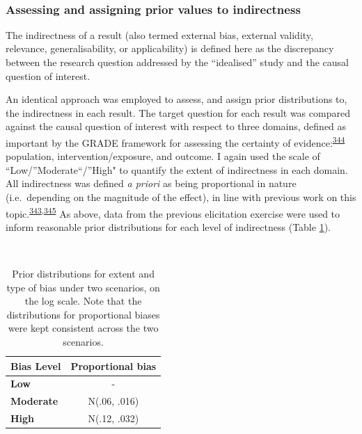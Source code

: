 \documentclass[a4paper, twoside]{templates/ociamthesis}
\begin{document}
~

\hypertarget{assessing-and-assigning-prior-values-to-indirectness}{%
\subsubsection{Assessing and assigning prior values to indirectness}\label{assessing-and-assigning-prior-values-to-indirectness}}

The indirectness of a result (also termed external bias, external validity, relevance, generalisability, or applicability) is defined here as the discrepancy between the research question addressed by the ``idealised'' study and the causal question of interest.

An identical approach was employed to assess, and assign prior distributions to, the indirectness in each result. The target question for each result was compared against the causal question of interest with respect to three domains, defined as important by the GRADE framework for assessing the certainty of evidence:\textsuperscript{\protect\hyperlink{ref-guyatt2011}{344}} population, intervention/exposure, and outcome. I again used the scale of ``Low/''Moderate``/''High" to quantify the extent of indirectness in each domain. All indirectness was defined \emph{a priori} as being proportional in nature (i.e.~depending on the magnitude of the effect), in line with previous work on this topic.\textsuperscript{\protect\hyperlink{ref-turner2009}{343},\protect\hyperlink{ref-thompson2011}{345}} As above, data from the previous elicitation exercise were used to inform reasonable prior distributions for each level of indirectness (Table \ref{tab:priorsIndirect-table}).

~





\begin{table}[H]

\caption[Prior distributions mapped to different extents of bias.]{\label{tab:priorsIndirect-table}Prior distributions for extent and type of bias under two scenarios, on the log scale. Note that the distributions for proportional biases were kept consistent across the two scenarios.}
\centering
\begin{tabular}[t]{>{}lc}
\toprule
\textbf{Bias Level} & \textbf{Proportional bias}\\
\midrule
\textbf{Low} & -\\
\midrule
\textbf{Moderate} & N(.06, .016)\\
\midrule
\textbf{High} & N(.12, .032)\\
\bottomrule
\end{tabular}
\end{table}
\end{document}
